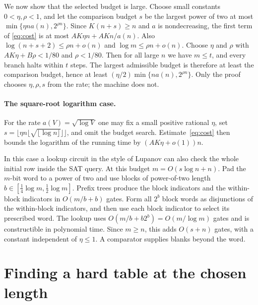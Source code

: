 \documentclass[12pt,letterpaper]{article}
\begin{document}
We now show that the selected budget is large. Choose small constants
\(0<\eta,\rho<1\), and let the comparison budget \(s\) be the largest power
of two at most \(\min\{\eta n a(n),2^{\rho n}\}\). Since \(K(n+s)\ge n\)
and \(a\) is nondecreasing, the first term of \eqref{eq:cost} is at most
\(AK\eta n+AKn/a(n)\). Also \(\log(n+s+2)\le\rho n+o(n)\) and
\(\log m\le\rho n+o(n)\). Choose \(\eta\) and \(\rho\) with
\(AK\eta+B\rho<1/80\) and \(\rho<1/80\). Then for all large \(n\) we have
\(m\le t\), and every branch halts within \(t\) steps. The largest
admissible budget is therefore at least the comparison budget, hence at
least \((\eta/2)\min\{n a(n),2^{\rho n}\}\). Only the proof chooses
\(\eta,\rho,s\) from the rate; the machine does not.

\paragraph{The square-root logarithm case.}
For the rate \(a(V)=\sqrt{\log V}\) one may fix a small positive rational
\(\eta\), set \(s=\lfloor\eta n\lfloor\sqrt{\lfloor\log n\rfloor}
\rfloor\rfloor\), and omit the budget search. Estimate~\eqref{eq:cost} then
bounds the logarithm of the running time by \((AK\eta+o(1))n\).

In this case a lookup circuit in the style of Lupanov \cite{lupanov} can
also check the whole initial row inside the SAT query. At this budget
\(m=O(s\log n+n)\). Pad the \(m\)-bit word to a power of two and use blocks
of power-of-two length \(b\in[\tfrac14\log m,\tfrac12\log m]\). Prefix
trees produce the block indicators and the within-block indicators in
\(O(m/b+b)\) gates. Form all \(2^b\) block words as disjunctions of the
within-block indicators, and then use each block indicator to select its
prescribed word. The lookup uses \(O(m/b+b2^b)=O(m/\log m)\) gates and is
constructible in polynomial time. Since \(m\ge n\), this adds \(O(s+n)\)
gates, with a constant independent of \(\eta\le1\). A comparator supplies
blanks beyond the word.

\section{Finding a hard table at the chosen length}\label{sec:hard}
\end{document}
